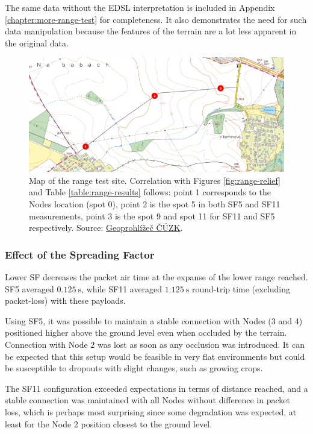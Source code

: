 The same data without the EDSL interpretation is included in Appendix \ref{chapter:more-range-test} for completeness. It also demonstrates the need for such data manipulation because the features of the terrain are a lot less apparent in the original data.

\begin{figure}[p]
    \includegraphics[width=.9\textwidth]{img/range-test-map.png}
    \caption{\label{fig:range-test-map}Map of the range test site. Correlation with Figures \ref{fig:range-relief} and Table \ref{table:range-results} follows: point 1 corresponds to the Nodes location (spot 0), point 2 is the spot 5 in both SF5 and SF11 measurements, point 3 is the spot 9 and spot 11 for SF11 and SF5 respectively. Source: \href{https://ags.cuzk.cz/geoprohlizec}{Geoprohlížeč ČÚZK}.}
\end{figure}

\subsubsection{Effect of the Spreading Factor}
Lower SF decreases the packet air time at the expanse of the lower range reached. SF5 averaged $0.125~\mathrm{s}$, while SF11 averaged $1.125~\mathrm{s}$ round-trip time (excluding packet-loss) with these payloads.

Using SF5, it was possible to maintain a stable connection with Nodes (3 and 4) positioned higher above the ground level even when occluded by the terrain. Connection with Node 2 was lost as soon as any occlusion was introduced. It can be expected that this setup would be feasible in very flat environments but could be susceptible to dropouts with slight changes, such as growing crops.

The SF11 configuration exceeded expectations in terms of distance reached, and a stable connection was maintained with all Nodes without difference in packet loss, which is perhaps most surprising since some degradation was expected, at least for the Node 2 position closest to the ground level. 

